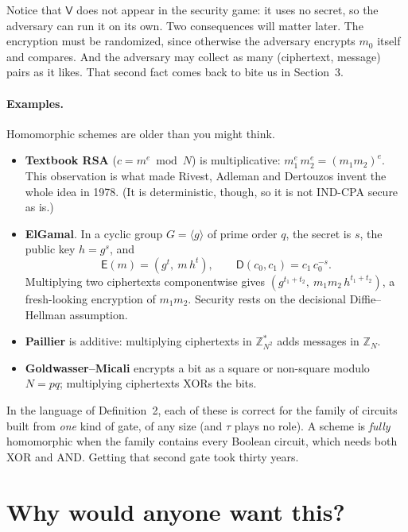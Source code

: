 \documentclass[11pt,a4paper]{article}
\newcommand{\ZZ}{\mathbb{Z}}
\newcommand{\Enc}{\mathsf{E}}
\newcommand{\Dec}{\mathsf{D}}
\newcommand{\Eval}{\mathsf{V}}
\newcommand{\indcpa}{\textsf{IND-CPA}}
\begin{document}
\noindent
Notice that $\Eval$ does not appear in the security game: it uses no secret, so
the adversary can run it on its own. Two consequences will matter later. The
encryption must be randomized, since otherwise the adversary encrypts $m_0$
itself and compares. And the adversary may collect as many
(ciphertext, message) pairs as it likes. That second fact comes back to bite
us in Section~3.

\paragraph{Examples.} Homomorphic schemes are older than you might think.
\begin{itemize}[leftmargin=*]
\item \textbf{Textbook RSA} ($c=m^e \bmod N$) is multiplicative:
  $m_1^e\,m_2^e=(m_1m_2)^e$. This observation is what made Rivest, Adleman
  and Dertouzos invent the whole idea in 1978. (It is deterministic, though,
  so it is not \indcpa{} secure as is.)
\item \textbf{ElGamal}. In a cyclic group $G=\langle g\rangle$ of prime order
  $q$, the secret is $s$, the public key $h=g^s$, and
  \[
  \Enc(m)=(g^t,\ m\,h^t),\qquad \Dec(c_0,c_1)=c_1\,c_0^{-s}.
  \]
  Multiplying two ciphertexts componentwise gives
  $(g^{t_1+t_2},\ m_1m_2\,h^{t_1+t_2})$, a fresh-looking encryption of
  $m_1m_2$. Security rests on the decisional Diffie--Hellman assumption.
\item \textbf{Paillier} is additive: multiplying ciphertexts in
  $\ZZ_{N^2}^\ast$ adds messages in $\ZZ_N$.
\item \textbf{Goldwasser--Micali} encrypts a bit as a square or non-square
  modulo $N=pq$; multiplying ciphertexts XORs the bits.
\end{itemize}
In the language of Definition~2, each of these is correct for the family of
circuits built from \emph{one} kind of gate, of any size (and $\tau$ plays no
role). A scheme is \emph{fully} homomorphic when the family contains every
Boolean circuit, which needs both XOR and AND. Getting that second gate took
thirty years.

\section{Why would anyone want this?}
\end{document}
